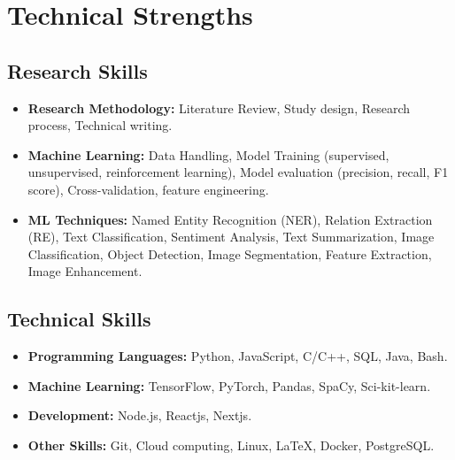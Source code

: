 \section{Technical Strengths}
\vspace{0.3cm}

\subsection{Research Skills}

\begin{itemize}[leftmargin=.3in]
\setlength\itemsep{.1em}
    \item \textbf{Research Methodology:} Literature Review, Study design, Research process, Technical writing.

    \item \textbf{Machine Learning:} Data Handling, Model Training (supervised, unsupervised, reinforcement learning), Model evaluation (precision, recall, F1 score), Cross-validation, feature engineering.\textbf{}
    
    \item \textbf{ML Techniques:} Named Entity Recognition (NER), Relation Extraction (RE), Text Classification, Sentiment Analysis, Text Summarization, Image Classification, Object Detection, Image Segmentation, Feature Extraction, Image Enhancement.
    




    
\end{itemize}


\subsection{Technical Skills}

\begin{itemize}[leftmargin=.3in]
\setlength\itemsep{.1em}
    \item \textbf{Programming Languages:} Python, JavaScript, C/C++, SQL, Java, Bash.

    \item \textbf{Machine Learning:} TensorFlow, PyTorch, Pandas, SpaCy, Sci-kit-learn.
    
    \item \textbf{Development: } Node.js, Reactjs, Nextjs.
    
    \item \textbf{Other Skills: } Git, Cloud computing, Linux, \LaTeX, Docker, PostgreSQL.
\end{itemize}
